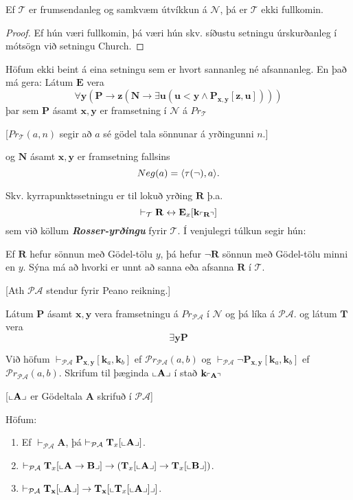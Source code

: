\documentclass[12pt]{book}
\newcommand{\cT}{\mathcal{T}}
\newcommand{\cP}{\mathcal{P}}
\newcommand{\cA}{\mathcal{A}}
\newcommand{\PA}{\mathcal{PA}}
\newcommand{\cN}{\mathcal{N}}
\newcommand{\mb}[1]{\mathbf{#1}}
\newcommand{\bA}{\mathbf{A}}
\newcommand{\bB}{\mathbf{B}}
\newcommand{\bE}{\mathbf{E}}
\newcommand{\bR}{\mathbf{R}}
\newcommand{\bT}{\mathbf{T}}
\newcommand{\bP}{\mathbf{P}}
\newcommand{\bx}{\mathbf{x}}
\newcommand{\bk}{\mathbf{k}}
\newcommand{\by}{\mathbf{y}}
\newcommand{\bz}{\mathbf{z}}
\newcommand{\bu}{\mathbf{u}}
\newcommand{\vT}{\vdash_{\cT}}
\newcommand{\vP}{\vdash_{\PA}}
\newcommand{\emphs}[1]{\textbf{\emph{#1}}}
\DeclarePairedDelimiter{\god}{\ulcorner}{\urcorner}
\DeclarePairedDelimiter{\pg}{\llcorner}{\lrcorner}
\begin{document}
\begin{setn}
Ef $\cT$ er frumsendanleg og samkvæm útvíkkun á $\cN$, þá er $\cT$ ekki fullkomin.
\end{setn}

\begin{proof}
  Ef hún væri fullkomin, þá væri hún skv. síðustu setningu úrskurðanleg í mótsögn
 við setningu Church.
\end{proof}

\begin{ath}
  Höfum ekki beint á eina setningu sem er hvort sannanleg né afsannanleg.
  En það má gera: Látum $\bE$ vera
  \[\forall \by (\bP \rightarrow \bz (\mb{N} \rightarrow \exists \bu (\bu < \by \wedge \bP_{\bx,\by}[\bz,\bu])))\]
  þar sem $\bP$ ásamt $\bx,\by$ er framsetning í $\cN$ á $Pr_{\cT}$

  [$Pr_{\cT}(a,n)$ segir að $a$ sé gödel tala sönnunar á yrðingunni $n$.]

  og $\mb{N}$  ásamt $\bx, \by$ er framsetning fallsins
  \[ Neg(a) = \langle\tau(\lnot),a\rangle. \]

  Skv. kyrrapunktssetningu er til lokuð yrðing $\bR$ þ.a.
  \[ \vT \bR \leftrightarrow \bE_x [\bk_{\god{\bR}}] \]
  sem við köllum \emphs{Rosser-yrðingu} fyrir $\cT$.
  Í venjulegri túlkun segir hún:
  
  Ef $\bR$  hefur sönnun með Gödel-tölu $y$, þá hefur 
  $\lnot \bR$  sönnun með Gödel-tölu minni en $y$. 
  Sýna má að hvorki er unnt að sanna eða afsanna $\bR$ í $\cT$.
\end{ath}

[Ath $\cP\cA$ stendur fyrir Peano reikning.]

Látum $\bP$ ásamt $\bx,\by$ vera framsetningu á 
$Pr_{\cP\cA}$ í $\cN$ og þá líka á $\PA$.
 og látum $\bT$ vera
 \[ \exists \by \bP \]

Við höfum $\vdash_{\PA} \bP_{\bx,\by} [\bk_a, \bk_b]$ ef $\cP r_{\PA}(a,b)$ og
$\vdash_{\PA} \lnot \bP_{\bx,\by} [\bk_a, \bk_b]$ ef $\cP r_{\PA}(a,b)$.
Skrifum til þæginda $\pg{\bA}$ í stað $\bk_{\god{\bA}}$

[$\pg{\bA}$ er Gödeltala $\bA$ skrifuð  í $\PA$] 

\begin{setn}
  Höfum:
\begin{enumerate}[label=\textbf{HBL\arabic*}]
  \item Ef $\vdash_{\PA} \bA$, þá $\vP \bT_{x} [\pg{\bA}]$.
  \item $\vP \bT_x [\pg{\bA \to \bB}] \to (\bT_x[\pg{\bA}] \to \bT_x[\pg{\bB}])$.
  
  \item $\vP \bT_{\bx}[\pg{\bA}] \to \bT_{\bx}[ \pg{\bT_x[\pg{\bA}]}]$.
  \end{enumerate}
\end{setn}
\end{document}
